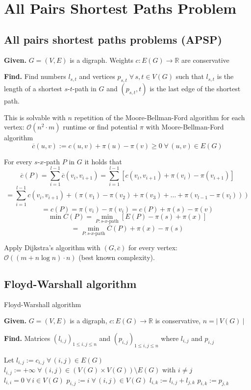 \documentclass{article}
\newcommand{\card}[1]{\left|\:\!#1\:\!\right|}
\newcommand{\given}[1]{\textbf{Given.} #1\par}
\newcommand{\find}[1]{\textbf{Find.} #1\par}
\newcommand{\gath}[2]{$#1$-$#2$-path} %
\newcommand{\fall}{\;\forall\,}
\begin{document}
\section{All Pairs Shortest Paths Problem}
%
\subsection{All pairs shortest paths problems (APSP)}
%
\given{$G = (V, E)$ is a digraph. Weights $c: E(G) \rightarrow \mathbb{R}$ are conservative}
\find{Find numbers $l_{s,t}$ and vertices $p_{s,t} \fall s, t \in V(G)$ such that $l_{s,t}$ is the length of a shortest \gath st in $G$ and $(p_{s,t}, t)$ is the last edge of the shortest path.}

This is solvable with $n$ repetition of the Moore-Bellman-Ford algorithm for each vertex: $\mathcal{O}(n^2 \cdot m)$ runtime or find potential $\pi$ with Moore-Bellman-Ford algorithm
\[
  \overline{c}(u,v) := c(u,v) + \pi(u) - \pi(v) \geq 0 \fall (u, v) \in E(G)
\]

For every \gath sx $P$ in $G$ it holds that
\[
  \overline{c}(P)
    = \sum_{i=1}^{l-1} \overline{c}(v_i, v_{i+1})
    = \sum_{i=1}^{l-1} [c(v_i, v_{i+1}) + \pi(v_i) - \pi(v_{i+1})]
\] \[
  = \sum_{i=1}^{l-1} c(v_i, v_{i+1}) + (\pi(v_1) - \pi(v_2) + \pi(v_3) + \ldots + \pi(v_{l-1} - \pi(v_l)))
\] \[
  = c(P) = \pi(v_i) - \pi(v_i) = c(P) + \pi(s) - \pi(v)
\] \[
  \min{C(P)} = \min_{P: \text{\gath sx}} \left[E(P) - \pi(s) + \pi(x)\right]
\] \[
  = \min_{P: \text{\gath sx}} \overline{C}(P) + \pi(x) - \pi(s)
\]

Apply Dijkstra's algorithm with $(G, \overline{c})$ for every vertex: $\mathcal{O}((m + n \log{n}) \cdot n)$ (best known complexity).

\subsection{Floyd-Warshall algorithm}
%
\begin{algorithm}
  \caption{Floyd-Warshall algorithm}
  \label{fw-algo}
  \given{$G = (V, E)$ is a digraph, $c: E(G) \rightarrow \mathbb{R}$ is conservative, $n = \card{V(G)}$}
  \find{Matrices $(l_{i,j})_{1 \leq i,j \leq n}$ and $(p_{i,j})_{1 \leq i,j \leq n}$ where $l_{i,j}$ and $p_{i,j}$}
\begin{algorithmic}[1]
  \State Let $l_{i,j} := c_{i,j} \fall (i,j) \in E(G)$
  \State $l_{i,j} := +\infty \fall (i,j) \in (V(G) \times V(G)) \setminus E(G)$ with $i \neq j$
  \State $l_{i,i} = 0 \fall i \in V(G)$
  \State $p_{i,j} := i \fall (i,j) \in V(G)$
              \State $l_{i,k} := l_{i,j} + l_{j,k}$
              \State $p_{i,k} := p_{j,k}$
            \EndIf
          \EndIf
        \EndFor
      \EndIf
    \EndFor
  \EndFor
\end{algorithmic}
\end{algorithm}
\end{document}
